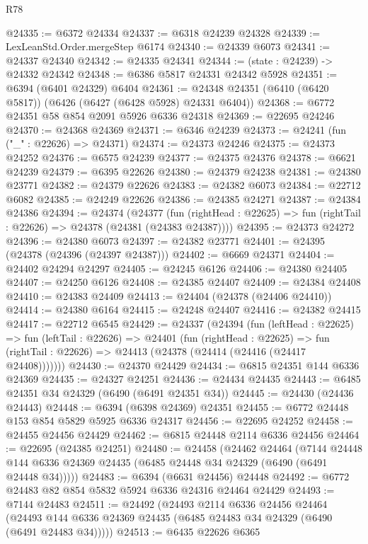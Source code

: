 \begin{lexlean}{R78}
\begin{coremodule}
@24335 := @6372 @24334
@24337 := @6318 @24239 @24328
@24339 := LexLeanStd.Order.mergeStep @6174
@24340 := @24339 @6073
@24341 := @24337 @24340
@24342 := @24335 @24341
@24344 := (state : @24239) -> @24332 @24342
@24348 := @6386 @5817 @24331 @24342 @5928
@24351 := @6394 (@6401 @24329) @6404
@24361 := @24348 @24351 (@6410 (@6420 @5817)) (@6426 (@6427 (@6428 @5928) @24331 @6404))
@24368 := @6772 @24351 @58 @854 @2091 @5926 @6336 @24318
@24369 := @22695 @24246
@24370 := @24368 @24369
@24371 := @6346 @24239
@24373 := @24241 (fun ("_" : @22626) => @24371)
@24374 := @24373 @24246
@24375 := @24373 @24252
@24376 := @6575 @24239
@24377 := @24375 @24376
@24378 := @6621 @24239
@24379 := @6395 @22626
@24380 := @24379 @24238
@24381 := @24380 @23771
@24382 := @24379 @22626
@24383 := @24382 @6073
@24384 := @22712 @6082
@24385 := @24249 @22626
@24386 := @24385 @24271
@24387 := @24384 @24386
@24394 := @24374
    (@24377
      (fun (rightHead : @22625) => fun (rightTail : @22626) => @24378 (@24381 (@24383 @24387))))
@24395 := @24373 @24272
@24396 := @24380 @6073
@24397 := @24382 @23771
@24401 := @24395 (@24378 (@24396 (@24397 @24387)))
@24402 := @6669 @24371
@24404 := @24402 @24294 @24297
@24405 := @24245 @6126
@24406 := @24380 @24405
@24407 := @24250 @6126
@24408 := @24385 @24407
@24409 := @24384 @24408
@24410 := @24383 @24409
@24413 := @24404 (@24378 (@24406 @24410))
@24414 := @24380 @6164
@24415 := @24248 @24407
@24416 := @24382 @24415
@24417 := @22712 @6545
@24429 := @24337
    (@24394
      (fun (leftHead : @22625) =>
      fun (leftTail : @22626) =>
      @24401
        (fun (rightHead : @22625) =>
        fun (rightTail : @22626) => @24413 (@24378 (@24414 (@24416 (@24417 @24408)))))))
@24430 := @24370 @24429
@24434 := @6815 @24351 @144 @6336 @24369
@24435 := @24327 @24251
@24436 := @24434 @24435
@24443 := @6485 @24351 @34 @24329 (@6490 (@6491 @24351 @34))
@24445 := @24430 (@24436 @24443)
@24448 := @6394 (@6398 @24369) @24351
@24455 := @6772 @24448 @153 @854 @5829 @5925 @6336 @24317
@24456 := @22695 @24252
@24458 := @24455 @24456 @24429
@24462 := @6815 @24448 @2114 @6336 @24456
@24464 := @22695 (@24385 @24251)
@24480 := @24458
    (@24462
      @24464
      (@7144 @24448 @144 @6336 @24369 @24435 (@6485 @24448 @34 @24329 (@6490 (@6491 @24448 @34)))))
@24483 := @6394 (@6631 @24456) @24448
@24492 := @6772 @24483 @82 @854 @5832 @5924 @6336 @24316 @24464 @24429
@24493 := @7144 @24483
@24511 := @24492
    (@24493
      @2114
      @6336
      @24456
      @24464
      (@24493 @144 @6336 @24369 @24435 (@6485 @24483 @34 @24329 (@6490 (@6491 @24483 @34)))))
@24513 := @6435 @22626 @6365

\end{coremodule}
\end{lexlean}
